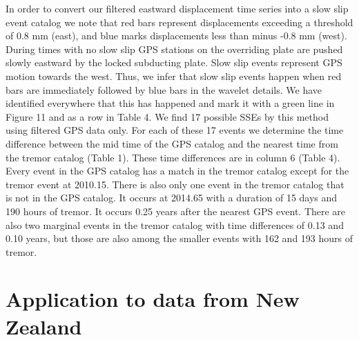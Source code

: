 \documentclass{article}
\begin{document}
In order to convert our filtered eastward displacement time series into a slow slip event catalog we note that red bars represent displacements exceeding a threshold of 0.8 mm (east), and blue marks displacements less than minus -0.8 mm (west).  During times with no slow slip GPS stations on the overriding plate are pushed slowly eastward by the locked subducting plate.  Slow slip events represent GPS motion towards the west.  Thus, we infer that slow slip events happen when red bars are immediately followed by blue bars in the wavelet details.  We have identified everywhere that this has happened and mark it with a green line in Figure 11 and as a row in Table 4.  We find 17 possible SSEs by this method using filtered GPS data only. For each of these 17 events we determine the time difference between the mid time of the GPS catalog and the nearest time from the tremor catalog (Table 1). These time differences are in column 6 (Table 4).  Every event in the GPS catalog has a match in the tremor catalog except for the tremor event at 2010.15. There is also only one event in the tremor catalog that is not in the GPS catalog. It occurs at 2014.65 with a duration of 15 days and 190 hours of tremor. It occurs 0.25 years after the nearest GPS event. There are also two marginal events in the tremor catalog with time differences of 0.13 and 0.10 years, but those are also among the smaller events with 162 and 193 hours of tremor.

\section{Application to data from New Zealand}
\end{document}
